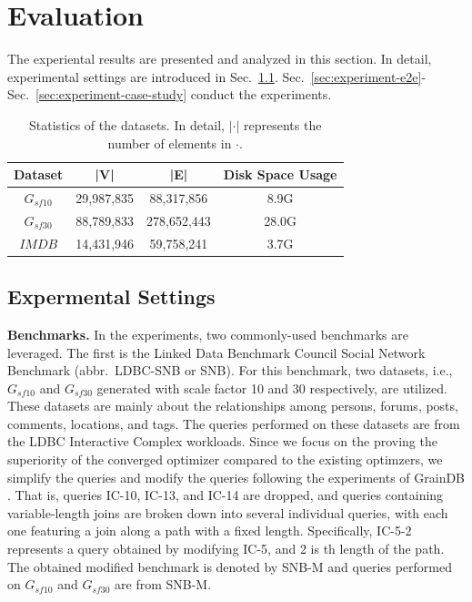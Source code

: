 \section{Evaluation}
The experiental results are presented and analyzed in this section.
In detail, experimental settings are introduced in Sec.~\ref{sec:experiment-settings}.
Sec.~\ref{sec:experiment-e2e}-Sec.~\ref{sec:experiment-case-study} conduct the experiments.

\begin{table}[t]
    \centering
    \begin{tabular}{c|c|c|c}
    \hline
    Dataset & |V| & |E| & Disk Space Usage\\ 
    \hline
    $G_{sf10}$& 29,987,835 & 88,317,856 & 8.9G \\
    \hline
    $G_{sf30}$ & 88,789,833 & 278,652,443 & 28.0G\\
    \hline
    $IMDB$ & 14,431,946 & 59,758,241 & 3.7G \\
    \hline
    \end{tabular}
    \caption{Statistics of the datasets. In detail, $|\cdot|$ represents the number of elements in $\cdot$.}
    \label{table:experiment-datasets}
\end{table}

\subsection{Expermental Settings}
\label{sec:experiment-settings}

\textbf{Benchmarks.} In the experiments, two commonly-used benchmarks are leveraged.
The first is the Linked Data Benchmark Council Social Network Benchmark (abbr.~LDBC-SNB or SNB).
For this benchmark, two datasets, i.e., $G_{sf10}$ and $G_{sf30}$ generated with scale factor 10 and 30 respectively, are utilized.
These datasets are mainly about the relationships among persons, forums, posts, comments, locations, and tags.
The queries performed on these datasets are from the LDBC Interactive Complex workloads.
Since we focus on the proving the superiority of the converged optimizer compared to the existing optimzers, we simplify the queries and modify the queries following the experiments of GrainDB \cite{graindb}.
That is, queries IC-10, IC-13, and IC-14 are dropped, and queries containing variable-length joins are broken down into several individual queries, with each one featuring a join along a path with a fixed length.
Specifically, IC-5-2 represents a query obtained by modifying IC-5, and 2 is th length of the path.
The obtained modified benchmark is denoted by SNB-M and queries performed on $G_{sf10}$ and $G_{sf30}$ are from SNB-M.

